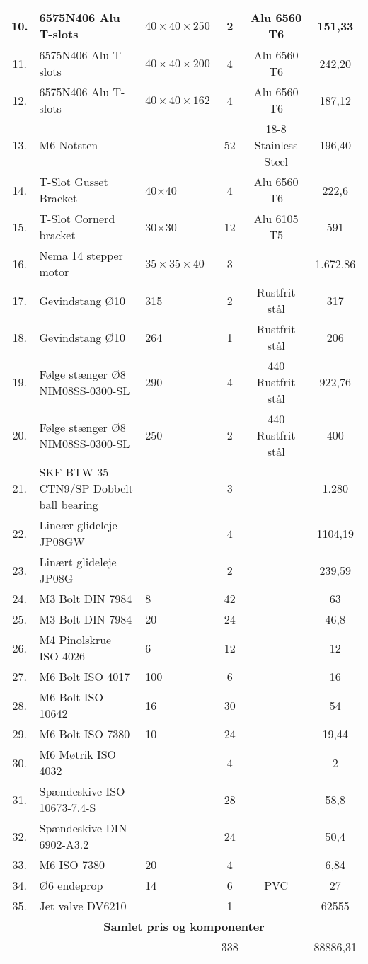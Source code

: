 \begin{longtable}{|c p{4.5cm} p{3cm} c c c|}
 10.& 6575N406 Alu T-slots &  $40\times 40 \times 250$ & 2 & Alu 6560 T6 &  151,33 \\\hline %
 11.& 6575N406 Alu T-slots & $40\times 40 \times 200$ & 4 & Alu 6560 T6 &  242,20 \\\hline %
 12.& 6575N406 Alu T-slots & $40\times 40 \times 162$ & 4 & Alu 6560 T6 & 187,12 \\\hline %
 13.& M6 Notsten &  & 52 & 18-8 Stainless Steel & 196,40 \\\hline %
 14.& T-Slot Gusset Bracket & 40$\times$40 & 4 & Alu 6560 T6 &  222,6 \\\hline %
 15.& T-Slot Cornerd bracket & 30$\times$30 & 12 & Alu 6105 T5 &  591 \\\hline %
 16.& Nema 14 stepper motor & $35 \times 35 \times 40$ & 3 &  & 1.672,86 \\\hline 
 17.& Gevindstang Ø10 & 315 & 2 & Rustfrit stål & 317 \\\hline
 18.& Gevindstang Ø10 & 264 & 1 &  Rustfrit stål & 206 \\\hline
 19.& Følge stænger Ø8 NIM08SS-0300-SL & 290 & 4 & 440 Rustfrit stål & 922,76 \\\hline
 20.& Følge stænger Ø8 NIM08SS-0300-SL & 250 & 2 & 440 Rustfrit stål & 400 \\\hline
 21.& SKF BTW 35 CTN9/SP Dobbelt ball bearing &  & 3 &  & 1.280 \\\hline
 22.& Lineær glideleje JP08GW &  & 4 &  & 1104,19 \\\hline
 23.& Linært glideleje JP08G &  & 2 &  & 239,59 \\\hline
 24.& M3 Bolt DIN 7984 & 8 & 42 &  & 63 \\\hline %
 25.& M3 Bolt DIN 7984 & 20 & 24 &  & 46,8 \\\hline
 26.& M4 Pinolskrue ISO 4026 & 6 & 12 &  & 12 \\\hline
 27.& M6 Bolt ISO 4017 & 100 & 6  &  & 16 \\\hline
 28.& M6 Bolt ISO 10642 & 16  &  30 &  & 54 \\\hline
 29.& M6 Bolt ISO 7380 &  10 & 24 &  & 19,44 \\\hline
 30.& M6 Møtrik ISO 4032 &  & 4 &  & 2 \\\hline
 31.& Spændeskive ISO 10673-7.4-S & & 28 &  & 58,8 \\\hline
 32.& Spændeskive DIN 6902-A3.2 & & 24 &  & 50,4 \\\hline
 33.& M6 ISO 7380 & 20 & 4 &  & 6,84 \\\hline
 34.& Ø6 endeprop & 14 & 6 & PVC & 27 \\\hline 
 35.& Jet valve DV6210 &  & 1 &  & 62555 \\\hline 
 
 \multicolumn{6}{|c|}{\cellcolor{aaublue} \color{white}\textbf{Samlet pris og komponenter}}  \\\hline

 &  &   & 338 & &  88886,31 \\\hline

\end{longtable}


